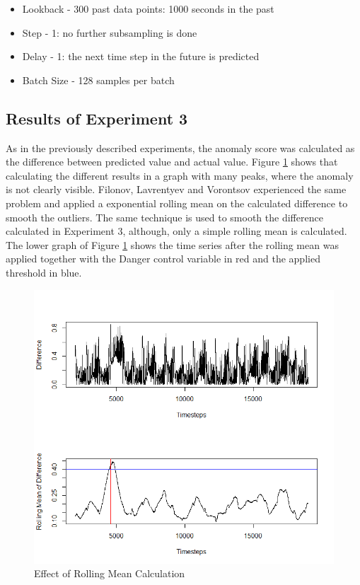 \begin{itemize}
	\item Lookback - 300 past data points: 1000 seconds in the past
	\item Step - 1: no further subsampling is done
	\item Delay - 1: the next time step in the future is predicted
	\item Batch Size - 128 samples per batch
\end{itemize}

\subsection{Results of Experiment 3}
As in the previously described experiments, the anomaly score was calculated as the difference between predicted value and actual value. Figure \ref{fig:rollmean} shows that calculating the different results in a graph with many peaks, where the anomaly is not clearly visible. Filonov, Lavrentyev and Vorontsov \parencite*{Filonov2016} experienced the same problem and applied a exponential rolling mean on the calculated difference to smooth the outliers. The same technique is used to smooth the difference calculated in Experiment 3, although, only a simple rolling mean is calculated. The lower graph of Figure \ref{fig:rollmean} shows the time series after the rolling mean was applied together with the Danger control variable in red and the applied threshold in blue.

\begin{figure}[h]
	\centering
	\includegraphics[scale=0.7]{Figures/Rollmean}
	\decoRule
	\caption[Effect of Rolling Mean Calculation]{Effect of Rolling Mean Calculation \parencite{Own}}
	\label{fig:rollmean}
\end{figure}

